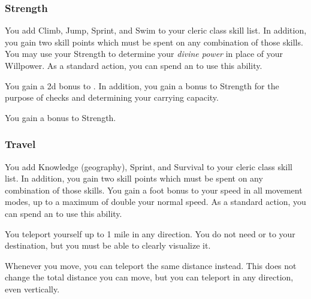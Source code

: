         \subsubsection{Strength}
             You add Climb, Jump, Sprint, and Swim to your cleric class skill list.
            In addition, you gain two skill points which must be spent on any combination of those skills.
             You may use your Strength to determine your \textit{divine power} in place of your Willpower.
             As a standard action, you can spend an  to use this ability.
            \begin{ability}
                \begin{spelleffects}
                    \spelleffect You gain a \plus2d bonus to .
                    In addition, you gain a  bonus to Strength for the purpose of checks and determining your carrying capacity.
                \end{spelleffects}
            \end{ability}
             You gain a  bonus to Strength.

        \subsubsection{Travel}
             You add Knowledge (geography), Sprint, and Survival to your cleric class skill list.
            In addition, you gain two skill points which must be spent on any combination of those skills.
             You gain a  foot bonus to your speed in all movement modes, up to a maximum of double your normal speed.
             As a standard action, you can spend an  to use this ability.
            \begin{ability}
                \begin{spelleffects}
                    \spelleffect You teleport yourself up to 1 mile in any direction.
                    You do not need  or  to your destination, but you must be able to clearly visualize it.
                \end{spelleffects}
            \end{ability}
             Whenever you move, you can teleport the same distance instead.
            This does not change the total distance you can move, but you can teleport in any direction, even vertically.

